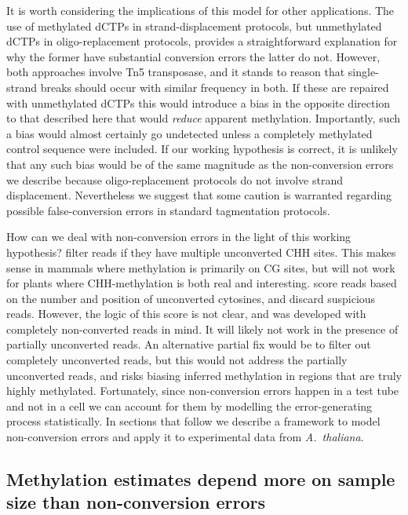 \documentclass[twocolumn,twoside,lettersize]{article}
\begin{document}
It is worth considering the implications of this model for other applications.
The use of methylated dCTPs in strand-displacement protocols, but unmethylated dCTPs in oligo-replacement protocols, provides a straightforward explanation for why the former have substantial conversion errors the latter do not.
However, both approaches involve Tn5 transposase, and it stands to reason that single-strand breaks should occur with similar frequency in both.
If these are repaired with unmethylated dCTPs this would introduce a bias in the opposite direction to that described here that would \textit{reduce} apparent methylation.
Importantly, such a bias would almost certainly go undetected unless a completely methylated control sequence were included.
If our working hypothesis is correct, it is unlikely that any such bias would be of the same magnitude as the non-conversion errors we describe because oligo-replacement protocols do not involve strand displacement.
Nevertheless we suggest that some caution is warranted regarding possible false-conversion errors in standard tagmentation protocols.

How can we deal with non-conversion errors in the light of this working hypothesis?
\textcite{suzuki2018whole} filter reads if they have multiple unconverted CHH sites.
This makes sense in mammals where methylation is primarily on CG sites, but will not work for plants where CHH-methylation is both real and interesting.
\textcite{lu2015improved} score reads based on the number and position of unconverted cytosines, and discard suspicious reads.
However, the logic of this score is not clear, and was developed with completely non-converted reads in mind.
It will likely not work in the presence of partially unconverted reads.
An alternative partial fix would be to filter out completely unconverted reads, but this would not address the partially unconverted reads, and risks biasing inferred methylation in regions that are truly highly methylated.
Fortunately, since non-conversion errors happen in a test tube and not in a cell we can account for them by modelling the error-generating process statistically.
In sections that follow we describe a framework to model non-conversion errors and apply it to experimental data from \emph{A.~thaliana}.

\subsection{Methylation estimates depend more on sample size than non-conversion errors}
\end{document}
